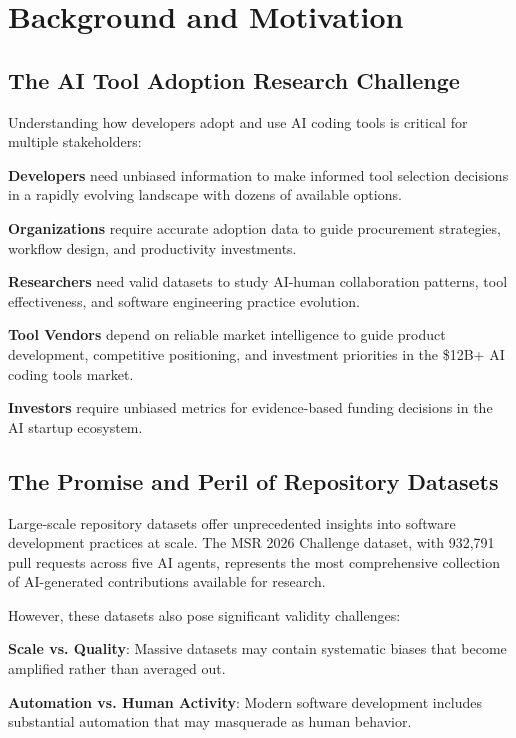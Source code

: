 \documentclass[conference]{IEEEtran}
\begin{document}
\section{Background and Motivation}

\subsection{The AI Tool Adoption Research Challenge}

Understanding how developers adopt and use AI coding tools is critical for multiple stakeholders:

\textbf{Developers} need unbiased information to make informed tool selection decisions in a rapidly evolving landscape with dozens of available options.

\textbf{Organizations} require accurate adoption data to guide procurement strategies, workflow design, and productivity investments.

\textbf{Researchers} need valid datasets to study AI-human collaboration patterns, tool effectiveness, and software engineering practice evolution.

\textbf{Tool Vendors} depend on reliable market intelligence to guide product development, competitive positioning, and investment priorities in the \$12B+ AI coding tools market.

\textbf{Investors} require unbiased metrics for evidence-based funding decisions in the AI startup ecosystem.

\subsection{The Promise and Peril of Repository Datasets}

Large-scale repository datasets offer unprecedented insights into software development practices at scale. The MSR 2026 Challenge dataset, with 932,791 pull requests across five AI agents, represents the most comprehensive collection of AI-generated contributions available for research.

However, these datasets also pose significant validity challenges:

\textbf{Scale vs. Quality}: Massive datasets may contain systematic biases that become amplified rather than averaged out.

\textbf{Automation vs. Human Activity}: Modern software development includes substantial automation that may masquerade as human behavior.
\end{document}

